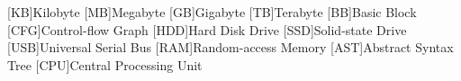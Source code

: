 \begin{abbreviations}
\begin{acronym}
    [KB]{Kilobyte}
    [MB]{Megabyte}
    [GB]{Gigabyte}
    [TB]{Terabyte}
    [BB]{Basic Block}
    [CFG]{Control-flow Graph}
    [HDD]{Hard Disk Drive}
    [SSD]{Solid-state Drive}
    [USB]{Universal Serial Bus}
    [RAM]{Random-access Memory}
    [AST]{Abstract Syntax Tree}
    [CPU]{Central Processing Unit}
\end{acronym}
\end{abbreviations}
